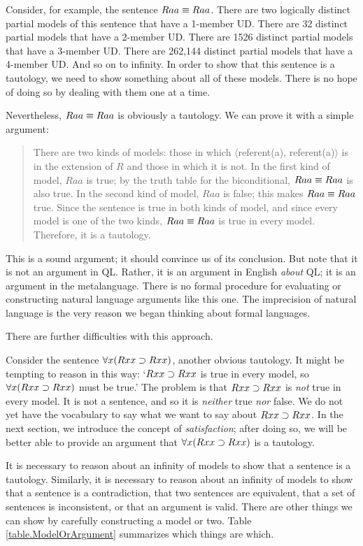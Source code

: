 Consider, for example, the sentence $Raa\equiv Raa$. There are two logically distinct partial models of this sentence that have a 1-member UD. There are 32 distinct partial models that have a 2-member UD. There are 1526 distinct partial models that have a 3-member UD. There are 262,144 distinct partial models that have a 4-member UD. And so on to infinity. In order to show that this sentence is a tautology, we need to show something about all of these models. There is no hope of doing so by dealing with them one at a time.

Nevertheless, $Raa\equiv Raa$ is obviously a tautology. We can prove it with a simple argument:
\begin{quote}
\label{allmodels1}
There are two kinds of models: those in which $\langle$referent(a), referent(a)$\rangle$ is in the extension of $R$ and those in which it is not. In the first kind of model, $Raa$ is true; by the truth table for the biconditional, $Raa\equiv Raa$ is also true. In the second kind of model, $Raa$ is false; this makes $Raa\equiv Raa$ true. Since the sentence is true in both kinds of model, and since every model is one of the two kinds, $Raa\equiv Raa$ is true in every model. Therefore, it is a tautology.
\end{quote}
This is a sound argument; it should convince us of its conclusion. But note that it is not an argument in QL. Rather, it is an argument in English \emph{about} QL; it is an argument in the metalanguage. There is no formal procedure for evaluating or constructing natural language arguments like this one. The imprecision of natural language is the very reason we began thinking about formal languages.

There are further difficulties with this approach.

Consider the sentence $\forall x(Rxx\supset Rxx)$, another obvious tautology. It might be tempting to reason in this way: `$Rxx\supset Rxx$ is true in every model, so $\forall x(Rxx\supset Rxx)$ must be true.' The problem is that $Rxx\supset Rxx$ is \emph{not} true in every model. It is not a sentence, and so it is \emph{neither} true \emph{nor} false. We do not yet have the vocabulary to say what we want to say about $Rxx\supset Rxx$. In the next section, we introduce the concept of \emph{satisfaction}; after doing so, we will be better able to provide an argument that $\forall x(Rxx\supset Rxx)$ is a tautology.

It is necessary to reason about an infinity of models to show that a sentence is a tautology. Similarly, it is necessary to reason about an infinity of models to show that a sentence is a contradiction, that two sentences are equivalent, that a set of sentences is inconsistent, or that an argument is valid. There are other things we can show by carefully constructing a model or two. Table \ref{table.ModelOrArgument} summarizes which things are which.






